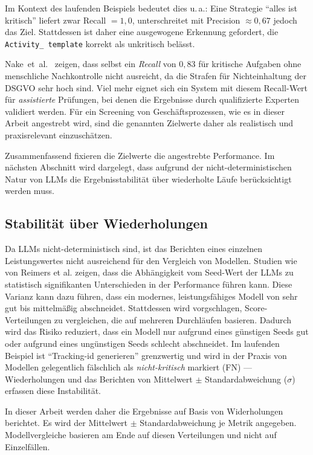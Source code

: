 Im Kontext des laufenden Beispiels bedeutet dies u.\,a.: Eine Strategie \enquote{alles ist kritisch} liefert zwar Recall $=1{,}0$, unterschreitet mit Precision $\approx 0{,}67$ jedoch das Ziel. Stattdessen ist daher eine ausgewogene Erkennung gefordert, die \texttt{Activity\_\linebreak~template} korrekt als unkritisch belässt.

Nake~et~al.\ \cite{nake2023towards} zeigen, dass selbst ein \emph{Recall} von $0{,}83$ für kritische Aufgaben ohne menschliche Nachkontrolle nicht ausreicht, da die Strafen für Nichteinhaltung der \ac{DSGVO} sehr hoch sind. Viel mehr eignet sich ein System mit diesem Recall-Wert für \emph{assistierte} Prüfungen, bei denen die Ergebnisse durch qualifizierte Experten validiert werden. Für ein Screening von Geschäftsprozessen, wie es in dieser Arbeit angestrebt wird, sind die genannten Zielwerte daher als realistisch und praxisrelevant einzuschätzen.

Zusammenfassend fixieren die Zielwerte die angestrebte Performance. Im nächsten Abschnitt wird dargelegt, dass aufgrund der nicht-deterministischen Natur von \acp{LLM} die Ergebnisstabilität über wiederholte Läufe berücksichtigt werden muss.

\subsection*{Stabilität über Wiederholungen}

Da \acp{LLM} nicht-deterministisch sind, ist das Berichten eines einzelnen Leistungswertes nicht ausreichend für den Vergleich von Modellen. Studien wie von Reimers et al. \cite{reimers2017reporting} zeigen, dass die Abhängigkeit vom Seed-Wert der \acp{LLM} zu statistisch signifikanten Unterschieden in der Performance führen kann. Diese Varianz kann dazu führen, dass ein modernes, leistungsfähiges Modell von sehr gut bis mittelmäßig abschneidet. Stattdessen wird vorgschlagen, Score-Verteilungen zu vergleichen, die auf mehreren Durchläufen basieren. Dadurch wird das Risiko reduziert, dass ein Modell nur aufgrund eines günstigen Seeds gut oder aufgrund eines ungünstigen Seeds schlecht abschneidet. Im laufenden Beispiel ist \enquote{Tracking-id generieren} grenzwertig und wird in der Praxis von Modellen gelegentlich fälschlich als \emph{nicht-kritisch} markiert (\ac{FN}) — Wiederholungen und das Berichten von Mittelwert $\pm$ Standardabweichung ($\sigma$) erfassen diese Instabilität.

In dieser Arbeit werden daher die Ergebnisse auf Basis von Widerholungen berichtet. Es wird der Mittelwert $\pm$ Standardabweichung je Metrik angegeben. Modellvergleiche basieren am Ende auf diesen Verteilungen und nicht auf Einzelfällen.